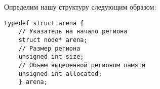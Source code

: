 Определим нашу структуру следующим образом:
\begin{verbatim}
typedef struct arena {
    // Указатель на начало региона
    struct node* arena;
    // Размер региона
    unsigned int size;
    // Объем выделенной регионом памяти
    unsigned int allocated;
    } arena;
\end{verbatim}